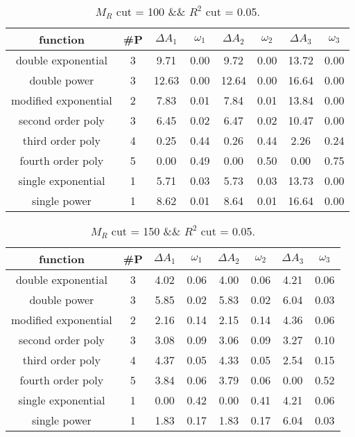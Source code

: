 
\begin{table}[H] 
\begin{center} 
\begin{tabular}{|c|c|cc|cc|cc|} 
\hline function & \#P & $\Delta A_1$ & $\omega_1$ & $\Delta A_2$ & $\omega_2$ & $\Delta A_3$ & $\omega_3$ \\ \hline 
double exponential &  3 &   9.71 &   0.00 &   9.72 &   0.00 &  13.72 &   0.00 \\ 
double power &  3 &  12.63 &   0.00 &  12.64 &   0.00 &  16.64 &   0.00 \\ 
modified exponential &  2 &   7.83 &   0.01 &   7.84 &   0.01 &  13.84 &   0.00 \\ 
second order poly &  3 &   6.45 &   0.02 &   6.47 &   0.02 &  10.47 &   0.00 \\ 
third order poly &  4 &   0.25 &   0.44 &   0.26 &   0.44 &   2.26 &   0.24 \\ 
fourth order poly &  5 &   0.00 &   0.49 &   0.00 &   0.50 &   0.00 &   0.75 \\ 
single exponential &  1 &   5.71 &   0.03 &   5.73 &   0.03 &  13.73 &   0.00 \\ 
single power &  1 &   8.62 &   0.01 &   8.64 &   0.01 &  16.64 &   0.00 \\ 
\hline 
\end{tabular} 
\caption{$M_R$ cut = 100 \&\& $R^2$ cut = 0.05.} 
\label{tab:FitChoices_100_0.05} 
\end{center} 
\end{table} 
 
 
\begin{table}[H] 
\begin{center} 
\begin{tabular}{|c|c|cc|cc|cc|} 
\hline function & \#P & $\Delta A_1$ & $\omega_1$ & $\Delta A_2$ & $\omega_2$ & $\Delta A_3$ & $\omega_3$ \\ \hline 
double exponential &  3 &   4.02 &   0.06 &   4.00 &   0.06 &   4.21 &   0.06 \\ 
double power &  3 &   5.85 &   0.02 &   5.83 &   0.02 &   6.04 &   0.03 \\ 
modified exponential &  2 &   2.16 &   0.14 &   2.15 &   0.14 &   4.36 &   0.06 \\ 
second order poly &  3 &   3.08 &   0.09 &   3.06 &   0.09 &   3.27 &   0.10 \\ 
third order poly &  4 &   4.37 &   0.05 &   4.33 &   0.05 &   2.54 &   0.15 \\ 
fourth order poly &  5 &   3.84 &   0.06 &   3.79 &   0.06 &   0.00 &   0.52 \\ 
single exponential &  1 &   0.00 &   0.42 &   0.00 &   0.41 &   4.21 &   0.06 \\ 
single power &  1 &   1.83 &   0.17 &   1.83 &   0.17 &   6.04 &   0.03 \\ 
\hline 
\end{tabular} 
\caption{$M_R$ cut = 150 \&\& $R^2$ cut = 0.05.} 
\label{tab:FitChoices_150_0.05} 
\end{center} 
\end{table} 
 
